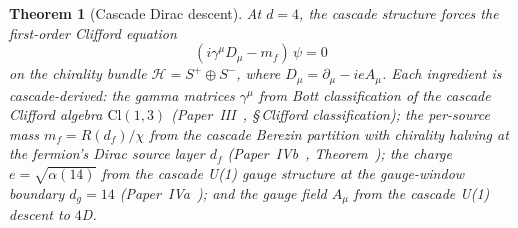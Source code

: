 \documentclass[12pt,a4paper]{article}
\newtheorem{theorem}{Theorem}[section]
\begin{document}
\begin{theorem}[Cascade Dirac descent]\label{thm:cascade-dirac-descent}
At $d=4$, the cascade structure forces the first-order Clifford
equation
\[
(i\gamma^\mu D_\mu - m_f)\,\psi = 0
\]
on the chirality bundle $\mathcal{H} = S^+ \oplus S^-$, where
$D_\mu = \partial_\mu - ieA_\mu$. Each ingredient is cascade-derived:
the gamma matrices $\gamma^\mu$ from Bott classification of the
cascade Clifford algebra $\mathrm{Cl}(1,3)$
(Paper~III~\cite{part3}, \S\,Clifford classification); the
per-source mass $m_f = R(d_f)/\chi$ from the cascade Berezin
partition with chirality halving at the fermion's Dirac source layer
$d_f$ (Paper~IVb~\cite{part4b}, Theorem~);
the charge $e = \sqrt{\alpha(14)}$ from the cascade U(1) gauge
structure at the gauge-window boundary $d_g = 14$
(Paper~IVa~\cite{part4a}); and the gauge field $A_\mu$ from the
cascade U(1) descent to $4$D.
\end{theorem}
\end{document}

